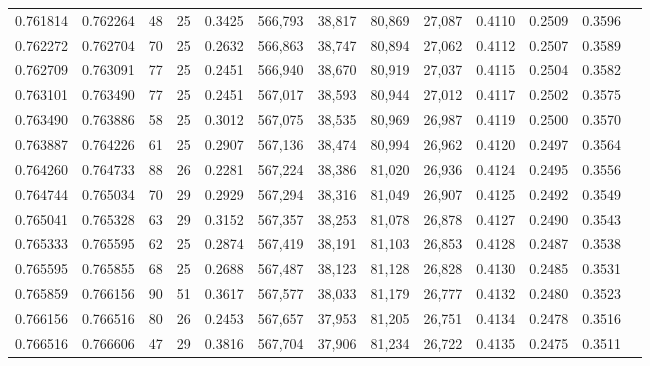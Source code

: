 \begin{tabular}{rrrrrrrrrrrrr}
0.761814 & 0.762264 &    48 &  25 &                                     0.3425 & 566,793 &  38,817 &  80,869 &  27,087 & 0.4110 & 0.2509 & 0.3596 \\
0.762272 & 0.762704 &    70 &  25 &                                     0.2632 & 566,863 &  38,747 &  80,894 &  27,062 & 0.4112 & 0.2507 & 0.3589 \\
0.762709 & 0.763091 &    77 &  25 &                                     0.2451 & 566,940 &  38,670 &  80,919 &  27,037 & 0.4115 & 0.2504 & 0.3582 \\
0.763101 & 0.763490 &    77 &  25 &                                     0.2451 & 567,017 &  38,593 &  80,944 &  27,012 & 0.4117 & 0.2502 & 0.3575 \\
0.763490 & 0.763886 &    58 &  25 &                                     0.3012 & 567,075 &  38,535 &  80,969 &  26,987 & 0.4119 & 0.2500 & 0.3570 \\
0.763887 & 0.764226 &    61 &  25 &                                     0.2907 & 567,136 &  38,474 &  80,994 &  26,962 & 0.4120 & 0.2497 & 0.3564 \\
0.764260 & 0.764733 &    88 &  26 &                                     0.2281 & 567,224 &  38,386 &  81,020 &  26,936 & 0.4124 & 0.2495 & 0.3556 \\
0.764744 & 0.765034 &    70 &  29 &                                     0.2929 & 567,294 &  38,316 &  81,049 &  26,907 & 0.4125 & 0.2492 & 0.3549 \\
0.765041 & 0.765328 &    63 &  29 &                                     0.3152 & 567,357 &  38,253 &  81,078 &  26,878 & 0.4127 & 0.2490 & 0.3543 \\
0.765333 & 0.765595 &    62 &  25 &                                     0.2874 & 567,419 &  38,191 &  81,103 &  26,853 & 0.4128 & 0.2487 & 0.3538 \\
0.765595 & 0.765855 &    68 &  25 &                                     0.2688 & 567,487 &  38,123 &  81,128 &  26,828 & 0.4130 & 0.2485 & 0.3531 \\
0.765859 & 0.766156 &    90 &  51 &                                     0.3617 & 567,577 &  38,033 &  81,179 &  26,777 & 0.4132 & 0.2480 & 0.3523 \\
0.766156 & 0.766516 &    80 &  26 &                                     0.2453 & 567,657 &  37,953 &  81,205 &  26,751 & 0.4134 & 0.2478 & 0.3516 \\
0.766516 & 0.766606 &    47 &  29 &                                     0.3816 & 567,704 &  37,906 &  81,234 &  26,722 & 0.4135 & 0.2475 & 0.3511 \\

\end{tabular}
